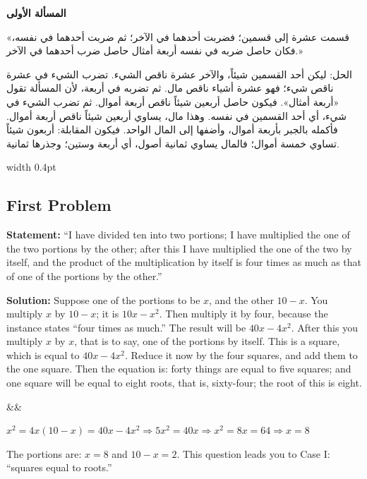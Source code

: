 \documentclass[11pt,a4paper,openany,oneside]{book}
\newenvironment{mathbox}[1][]{%
  \smallskip\par\noindent
  \begin{lrbox}{\mathboxsave}
  \begin{minipage}{\dimexpr\linewidth-2\fboxsep-2\fboxrule\relax}%
  \setlength{\parskip}{0.3em}%
  \ifx&#1&\else\textbf{#1}\\[0.2cm]\fi
}{%
  \end{minipage}%
  \end{lrbox}
  \fcolorbox{sectioncolor}{mathbg}{\usebox{\mathboxsave}}%
  \smallskip}
\begin{document}
\noindent\begin{minipage}[t]{0.48\textwidth}
\raggedleft

\begin{Arabic}
\textbf{المسألة الأولى}

«قسمت عشرة إلى قسمين؛ فضربت أحدهما في الآخر؛ ثم ضربت أحدهما في نفسه، فكان حاصل ضربه في نفسه أربعة أمثال حاصل ضرب أحدهما في الآخر.»

الحل: ليكن أحد القسمين شيئاً، والآخر عشرة ناقص الشيء. تضرب الشيء في عشرة ناقص شيء؛ فهو عشرة أشياء ناقص مال. ثم تضربه في أربعة، لأن المسألة تقول «أربعة أمثال». فيكون حاصل أربعين شيئاً ناقص أربعة أموال. ثم تضرب الشيء في شيء، أي أحد القسمين في نفسه. وهذا مال، يساوي أربعين شيئاً ناقص أربعة أموال. فأكمله بالجبر بأربعة أموال، وأضفها إلى المال الواحد. فيكون المقابلة: أربعون شيئاً تساوي خمسة أموال؛ فالمال يساوي ثمانية أصول، أي أربعة وستين؛ وجذرها ثمانية.
\end{Arabic}

\end{minipage}%
\hfill\vrule width 0.4pt\hfill
\begin{minipage}[t]{0.48\textwidth}
\raggedright

\subsection*{First Problem}

\textbf{Statement:} ``I have divided ten into two portions; I have multiplied the one of the two portions by the other; after this I have multiplied the one of the two by itself, and the product of the multiplication by itself is four times as much as that of one of the portions by the other.''

\textbf{Solution:} Suppose one of the portions to be $x$, and the other $10 - x$. You multiply $x$ by $10 - x$; it is $10x - x^2$. Then multiply it by four, because the instance states ``four times as much.'' The result will be $40x - 4x^2$. After this you multiply $x$ by $x$, that is to say, one of the portions by itself. This is a square, which is equal to $40x - 4x^2$. Reduce it now by the four squares, and add them to the one square. Then the equation is: forty things are equal to five squares; and one square will be equal to eight roots, that is, sixty-four; the root of this is eight.

\begin{mathbox}
$x^2 = 4x(10-x) = 40x - 4x^2 \Rightarrow 5x^2 = 40x \Rightarrow x^2 = 8x = 64 \Rightarrow x = 8$
\end{mathbox}

The portions are: $x = 8$ and $10 - x = 2$. This question leads you to Case I: ``squares equal to roots.''

\end{minipage}
\vspace{0.3cm}
\end{document}
